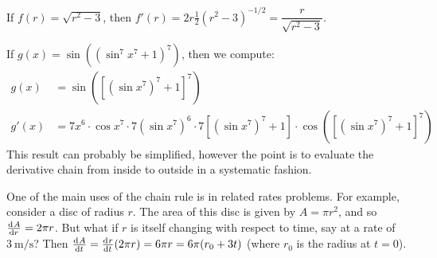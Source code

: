 \begin{ex}
  If $ f(r) = \sqrt{r^2 - 3} $, then $ f'(r) = 2r \frac{1}{2} \left(r^2 - 3\right)^{-1/2} = \dfrac{r}{\sqrt{r^2 - 3}} $.
\end{ex}

\begin{ex}
  If $ g(x) = \sin((\sin^7 x^7 + 1)^7) $, then we compute:
  \begin{align*}
    g(x)  &= \sin \left( \left[ \left( \sin x^7 \right)^7 + 1 \right]^7 \right)\\
    g'(x) &= 7x^6 \cdot \cos x^7 \cdot 7\left(\sin x^7\right)^6 \cdot 7\left[\left(\sin x^7\right)^7 + 1\right]
                  \cdot \cos \left( \left[ \left( \sin x^7 \right)^7 + 1 \right]^7 \right)
  \end{align*}
  This result can probably be simplified, however the point is to evaluate the derivative chain from inside to outside in a systematic fashion.
\end{ex}

\begin{ex}
  One of the main uses of the chain rule is in related rates problems. For example, consider
  a disc of radius $ r $. The area of this disc is given by $ A = \pi r^2 $, and so $ \od{A}{r} = 2\pi r $.
  But what if $ r $ is itself changing with respect to time, say at a rate of $ \SI{3}{\metre\per\second} $? Then
  $ \od{A}{t} = \od{r}{t} (2\pi r) = 6\pi r = 6\pi (r_0 + 3t) $ (where $ r_0 $ is the radius at $ t = 0 $).
\end{ex}

